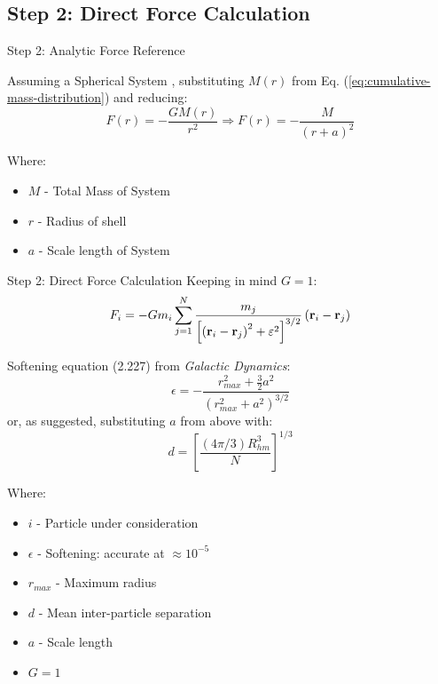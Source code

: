 \subsection{Step 2: Direct Force Calculation}
\begin{frame}{Step 2: Analytic Force Reference}

	Assuming a Spherical System \cite{2008gady}, substituting $M(r)$ from Eq.
	(\ref{eq:cumulative-mass-distribution}) and reducing:
	\begin{equation}
		F(r) = - \frac{GM(r)}{r^2} \Rightarrow F(r) = - \frac{M}{(r+a)^2}
	\end{equation}

	{\footnotesize Where:
	\begin{itemize}
		\item $M$ - Total Mass of System
		\item $r$ - Radius of shell
		\item $a$ - Scale length of System
	\end{itemize}}
\end{frame}

\begin{frame}{Step 2: Direct Force Calculation}
	Keeping in mind $G=1$:
	\begin{equation}
		F_i=-G m_i \sum_{j=1}^N \frac{m_j}{\left[\left(\vb{r}_i-\vb{r}_j\right)^2+\varepsilon^2\right]^{3 /
				2}}\left(\vb{r}_i-\vb{r}_j\right)
	\end{equation}

	Softening equation (2.227) from \textit{Galactic Dynamics}:
	\begin{equation}
		\epsilon=-\frac{r_{max}^2+\frac{3}{2} a^2}{\left(r_{max}^2+a^2\right)^{3 / 2}}
	\end{equation}
	or, as suggested, substituting $a$ from above with:
	\begin{equation}
		d=\left[\frac{(4 \pi / 3) R_{hm}^3}{N}\right]^{1 / 3}
	\end{equation}

	{\footnotesize Where:
	\begin{itemize}
		\item $i$ - Particle under consideration
		\item $\epsilon$ - Softening: accurate at $\approx 10^{-5}$
		\item $r_{max}$ - Maximum radius
		\item $d$ - Mean inter-particle separation
		\item $a$ - Scale length
		\item $G=1$
	\end{itemize}
	}
\end{frame}

